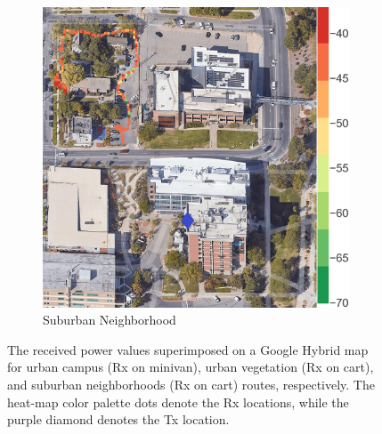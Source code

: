 \documentclass[12pt, draftcls, onecolumn]{IEEEtran}
\begin{document}
\begin{figure} [t]
\begin{subfigure}{0.2579\linewidth}
         \centering
         \includegraphics[width=1.0\linewidth]{figs/rx_suburban_fraternities.jpg}
         \caption{Suburban Neighborhood}
         \label{F5c}
     \end{subfigure}
     \vspace{-2mm}
     \caption{The received power values superimposed on a Google Hybrid map for urban campus (Rx on minivan), urban vegetation (Rx on cart), and suburban neighborhoods (Rx on cart) routes, respectively. The heat-map color palette dots denote the Rx locations, while the purple diamond denotes the Tx location.}
     \label{F5}
\end{figure}
\end{document}
